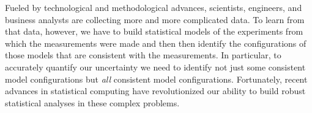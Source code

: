 \documentclass[12pt, oneside]{article}
\begin{document}
\thispagestyle{empty}

\begin{center}

\vspace{5mm}
\vspace{10mm}

\end{center}

Fueled by technological and methodological advances, scientists,
engineers, and business analysts are collecting more and more 
complicated data.  To learn from that data, however, we have to build 
statistical models of the experiments from which the measurements
were made and then then identify the configurations of those models 
that are consistent with the measurements.  In particular, to accurately 
quantify our uncertainty we need to identify not just some consistent 
model configurations but \emph{all} consistent model configurations.
Fortunately, recent advances in statistical computing have revolutionized
our ability to build robust statistical analyses in these complex problems.  
\end{document}
